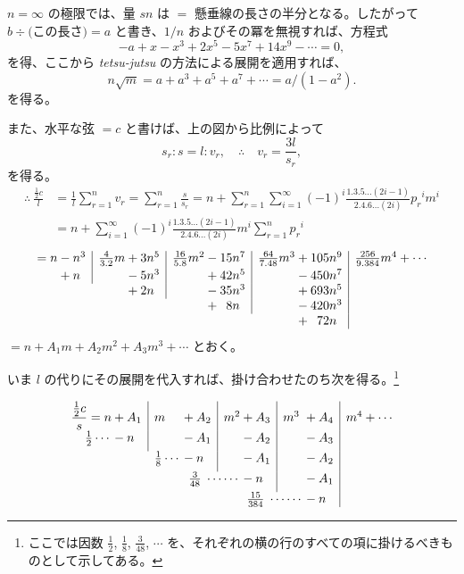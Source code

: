 \documentclass[11pt]{article}
\newcommand{\scanpage}[2]{\clearpage\setcounter{footnote}{0}\noindent{\footnotesize\color{gray}PDF #1 頁 · #2}\par\medskip}
\begin{document}
$n=\infty$ の極限では、量 $sn$ は $=$ 懸垂線の長さの半分となる。したがって $b\div\text{(この長さ)}=a$ と書き、$1/n$ およびその冪を無視すれば、方程式
\[
-a+x-x^3+2x^5-5x^7+14x^9-\cdots=0,
\]
を得、ここから \emph{tetsu-jutsu} の方法による展開を適用すれば、
\[
n\sqrt{m}=a+a^3+a^5+a^7+\cdots=a/(1-a^2).
\]
を得る。

また、水平な弦 $=c$ と書けば、上の図から比例によって
\[
s_r:s=l:v_r,\quad\therefore\quad v_r=\frac{3l}{s_r},
\]
を得る。
\begin{align*}
\therefore\ \frac{\frac{1}{2}c}{l}&=\frac{1}{l}\sum_{r=1}^{n}v_r=\sum_{r=1}^{n}\frac{s}{s_r}=n+\sum_{r=1}^{n}\sum_{i=1}^{\infty}(-1)^i\frac{1.3.5\ldots(2i-1)}{2.4.6\ldots(2i)}p_r{}^i m^i\\
&=n+\sum_{i=1}^{\infty}(-1)^i\frac{1.3.5\ldots(2i-1)}{2.4.6\ldots(2i)}m^i\sum_{r=1}^{n}p_r{}^i
\end{align*}
\[
\begin{array}{@{}r@{}l|l@{}l|l@{}l|l@{}l|l@{}}
=n & {}-n^3 & \frac{4}{3.2}m & {}+3n^5 & \frac{16}{5.8}m^2 & {}-15n^7 & \frac{64}{7.48}m^3 & {}+105n^9 & \frac{256}{9.384}m^4+\cdots\\[2pt]
 & {}+n & & {}-5n^3 & & {}+42n^5 & & {}-450n^7 & \\
 & \multicolumn{1}{l}{} & & {}+2n & & {}-35n^3 & & {}+693n^5 & \\
 & \multicolumn{1}{l}{} & & \multicolumn{1}{l}{} & & {}+\phantom{0}8n & & {}-420n^3 & \\
 & \multicolumn{1}{l}{} & & \multicolumn{1}{l}{} & & \multicolumn{1}{l}{} & & {}+\phantom{0}72n &
\end{array}
\]
$=n+A_1m+A_2m^2+A_3m^3+\cdots$ とおく。

いま $l$ の代りにその展開を代入すれば、掛け合わせたのち次を得る。\footnote{ここでは因数 $\frac{1}{2}$, $\frac{1}{8}$, $\frac{3}{48}$, $\cdots$ を、それぞれの横の行のすべての項に掛けるべきものとして示してある。}

\scanpage{0314}{印刷頁 300}
\[
\begin{array}{r@{}l|l@{}l|l@{}l|l@{}l|l}
\dfrac{\frac{1}{2}c}{s} = n & {}+ A_1 & m & {}+ A_2 & m^2 & {}+ A_3 & m^3 & {}+ A_4 & m^4 + \cdots\\[1ex]
\frac{1}{2}\cdots & {}- n & & {}- A_1 & & {}- A_2 & & {}- A_3 & \\[1ex]
 & \multicolumn{1}{l}{} & \frac{1}{8}\cdots & {}- n & & {}- A_1 & & {}- A_2 & \\[1ex]
 & \multicolumn{1}{l}{} & & \multicolumn{2}{r@{}}{\frac{3}{48}\;\cdots\cdots} & {}- n & & {}- A_1 & \\[1ex]
 & \multicolumn{1}{l}{} & & \multicolumn{1}{l}{} & & \multicolumn{2}{r@{}}{\frac{15}{384}\;\cdots\cdots} & {}- n &
\end{array}
\]
\end{document}
